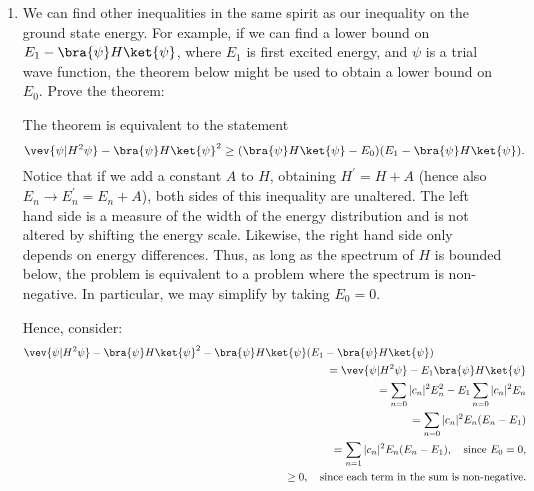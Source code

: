 \begin{enumerate}
\fi



\item We can find other inequalities in the same spirit as our inequality on the ground state energy. For example, if we can find a lower bound on $E_1 - \bra{\psi}H\ket{\psi}$, where $E_1$ is first excited energy, and $\psi$ is a trial wave function, the theorem below might be used to obtain a lower bound on $E_0$. Prove the theorem:

\ifsolve
{} The theorem is equivalent to the statement
\begin{equation}
 \vev{\psi|H^2\psi} - \bra{\psi}H\ket{\psi}^2 \ge (\bra{\psi}H\ket{\psi} - E_0)(E_1 - \bra{\psi}H\ket{\psi}).
\end{equation}
Notice that if we add a constant $A$ to $H$, obtaining $H^\prime = H+A$ (hence also $E_n\to E_n^\prime= E_n+A$), both sides of this inequality are unaltered. The left hand side is a measure of the width of the energy distribution and is not altered by shifting the energy scale. Likewise, the right hand side only depends on energy differences. Thus, as long as the spectrum of $H$ is bounded below, the problem is equivalent to a problem where the spectrum is non-negative. In particular, we may simplify by taking $E_0=0$. 

Hence, consider:
\begin{eqnarray}
 \vev{\psi|H^2\psi} - \bra{\psi}H\ket{\psi}^2 - \bra{\psi}H\ket{\psi}(E_1 - \bra{\psi}H\ket{\psi}) && \nonumber \\
  &&\hskip-2in = \vev{\psi|H^2\psi} - E_1\bra{\psi}H\ket{\psi} \\
  &&\hskip-2in = \sum_{n=0} |c_n|^2E_n^2 - E_1\sum_{n=0} |c_n|^2E_n \\
  &&\hskip-2in = \sum_{n=0} |c_n|^2 E_n(E_n-E_1) \\
  &&\hskip-2in = \sum_{n=1} |c_n|^2 E_n(E_n-E_1),\quad\hbox{since }E_0=0, \\
  &&\hskip-2in \ge 0,\quad\hbox{since each term in the sum is non-negative.} \nonumber
\end{eqnarray}
\fi



\end{enumerate}
